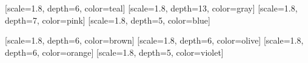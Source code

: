 \documentclass{article}
\begin{document}
[scale=1.8, depth=6, color=teal]
[scale=1.8, depth=13, color=gray]
[scale=1.8, depth=7, color=pink]
[scale=1.8, depth=5, color=blue]

\vspace{.5cm}
[scale=1.8, depth=6, color=brown]
[scale=1.8, depth=6, color=olive]
[scale=1.8, depth=6, color=orange]
[scale=1.8, depth=5, color=violet]
\end{document}
